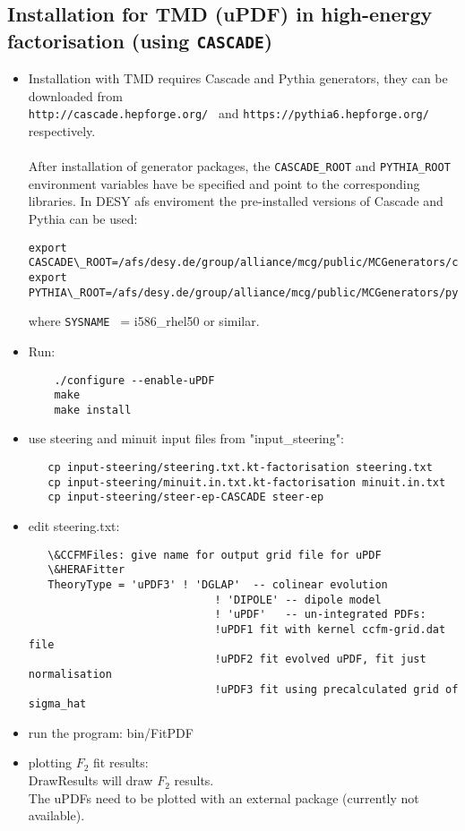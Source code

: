 \subsection{Installation for TMD (uPDF) in high-energy factorisation (using  {\tt CASCADE})}

\begin{itemize}

\item Installation with TMD requires Cascade and Pythia generators, 
they can be downloaded from\\
{\tt http://cascade.hepforge.org/ } and 
{\tt https://pythia6.hepforge.org/ } respectively. \\
        \\
After installation of generator packages, the {\tt CASCADE\_ROOT}  and {\tt PYTHIA\_ROOT} 
environment variables have be specified and point to the corresponding libraries. 
In DESY afs enviroment the pre-installed versions of Cascade and Pythia can be used:  
%
{\footnotesize\begin{verbatim}
export CASCADE\_ROOT=/afs/desy.de/group/alliance/mcg/public/MCGenerators/cascade/2.2.04/\$SYSNAME 
export PYTHIA\_ROOT=/afs/desy.de/group/alliance/mcg/public/MCGenerators/pythia6/425/\$SYSNAME}
\end{verbatim} }
\normalsize
where {\tt SYSNAME } = i586\_rhel50 or similar.

\item Run:
\begin{verbatim}
    ./configure --enable-uPDF
    make 
    make install
\end{verbatim}


\item use steering and minuit input files from "input\_steering": 

   \begin{verbatim} 
   cp input-steering/steering.txt.kt-factorisation steering.txt 
   cp input-steering/minuit.in.txt.kt-factorisation minuit.in.txt 
   cp input-steering/steer-ep-CASCADE steer-ep 
   \end{verbatim}

\item  edit steering.txt: 
   \begin{verbatim}
   \&CCFMFiles: give name for output grid file for uPDF   
   \&HERAFitter 
   TheoryType = 'uPDF3' ! 'DGLAP'  -- colinear evolution
                             ! 'DIPOLE' -- dipole model 
                             ! 'uPDF'   -- un-integrated PDFs:
                             !uPDF1 fit with kernel ccfm-grid.dat file
                             !uPDF2 fit evolved uPDF, fit just normalisation
                             !uPDF3 fit using precalculated grid of sigma_hat
  \end{verbatim}

\item run the program: bin/FitPDF 
   
\item plotting $F_2$ fit results: \\
DrawResults  will draw $F_2$ results. \\
The uPDFs need to be plotted with an external package (currently not available).
\end{itemize}

